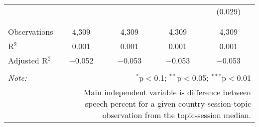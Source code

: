 \begin{table}[!htbp]
\begin{tabular}{@{\extracolsep{5pt}}lcccc}
  &  &  &  & (0.029) \\ 
  & & & & \\ 
\hline \\[-1.8ex] 
Observations & 4,309 & 4,309 & 4,309 & 4,309 \\ 
R$^{2}$ & 0.001 & 0.001 & 0.001 & 0.001 \\ 
Adjusted R$^{2}$ & $-$0.052 & $-$0.053 & $-$0.053 & $-$0.053 \\ 
\hline 
\hline \\[-1.8ex] 
\textit{Note:}  & \multicolumn{4}{r}{$^{*}$p$<$0.1; $^{**}$p$<$0.05; $^{***}$p$<$0.01} \\ 
 & \multicolumn{4}{r}{Main independent variable is difference between speech percent for a given country-session-topic observation from the topic-session median.} \\ 
\end{tabular} 
\end{table} 
